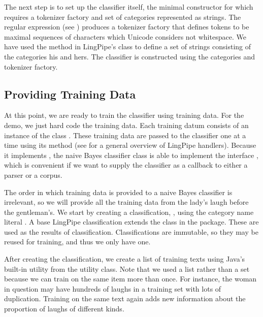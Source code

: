 The next step is to set up the classifier itself, the
minimal constructor for which requires a tokenizer factory
and set of categories represented as strings.
%
%
The regular expression  (see
) produces a tokenizer factory that
defines tokens to be maximal sequences of characters which Unicode
considers not whitespace.  We have used the  method in
LingPipe's  class to define a set of strings
consisting of the categories his and hers.  The classifier is
constructed using the categories and tokenizer factory.


\subsection{Providing Training Data}

At this point, we are ready to train the classifier using training
data.  For the demo, we just hard code the training data.  Each
training datum consists of an instance of the class
.  These training data are passed to
the classifier one at a time using its  method (see
 for a general overview of LingPipe handlers).
Because it implements , the
naive Bayes classifier class is able to implement the interface
, which is convenient if
we want to supply the classifier as a callback to either a parser or a
corpus.

The order in which training data is provided to a naive
Bayes classifier is irrelevant, so we will provide all the
training data from the lady's laugh before the gentleman's.
%
%
We start by creating a classification, , using the
category name literal .  A base LingPipe classification
extends the  class in the
 package.  These are used as the results of
classification.  Classifications are immutable, so they may be reused
for training, and thus we only have one.

After creating the classification, we create a list of training texts
using Java's built-in utility  from the 
utility class.  Note that we used a list rather than a set because we
can train on the same item more than once.  For instance, the woman in
question may have hundreds of laughs in a training set with lots of
duplication.  Training on the same text again adds new information
about the proportion of laughs of different kinds. 

